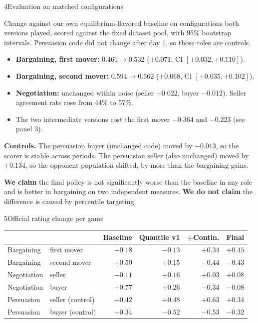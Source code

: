 \documentclass[10pt]{article}
\newcommand{\bodysize}{\fontsize{7.9}{10.3}\selectfont}
\newcommand{\smallsize}{\fontsize{6.9}{8.9}\selectfont}
\newcommand{\lead}[1]{\textbf{\color{navy}#1}}
\begin{document}
{\begin{minipage}[t][295.3mm][t]{207.8mm}
\begin{minipage}[t]{0.485\linewidth}
\begin{panel}{4\quad Evaluation on matched configurations}
\raggedright\smallsize\color{muted}
Change against our own equilibrium-flavored baseline on configurations both
versions played, scored against the fixed dataset pool, with 95\% bootstrap
intervals. Persuasion code did not change after day 1, so those roles are controls.

\vspace{1.6mm}\bodysize\color{ink}
\begin{itemize}
  \item \textbf{Bargaining, first mover:} $0.461\rightarrow0.532$
        ($+0.071$, CI $[+0.032,+0.110]$).
  \item \textbf{Bargaining, second mover:} $0.594\rightarrow0.662$
        ($+0.068$, CI $[+0.035,+0.102]$).
  \item \textbf{Negotiation:} unchanged within noise (seller $+0.022$, buyer
        $-0.012$). Seller agreement rate rose from 44\% to 57\%.
  \item The two intermediate versions cost the first mover $-0.364$ and
        $-0.223$ (see panel 3).
\end{itemize}
\vspace{1.2mm}
\lead{Controls.} The persuasion buyer (unchanged code) moved by $-0.013$, so
the scorer is stable across periods. The persuasion seller (also unchanged)
moved by $+0.134$, so the opponent population shifted, by more than the
bargaining gains.
\begin{tcolorbox}[colback=good!9, colframe=good!9, arc=1mm, boxrule=0pt,
  left=2mm, right=2mm, top=1.3mm, bottom=1.3mm, before skip=1.8mm, after skip=0mm]\bodysize
\textbf{We claim} the final policy is not significantly worse than the baseline
in any role and is better in bargaining on two independent measures.
\textbf{We do not claim} the difference is caused by percentile targeting.
\end{tcolorbox}
\end{panel}

\begin{panel}{5\quad Official rating change per game}
\centering\smallsize
\setlength{\tabcolsep}{2.6pt}
\begin{tabular}{@{}llrrrr@{}}
\toprule
 & & Baseline & Quantile v1 & +Contin. & Final\\
\midrule
Bargaining & first mover & $+0.18$ & $-0.13$ & $+0.34$ & \textbf{\color{good}$\mathbf{+0.45}$}\\
Bargaining & second mover & $+0.50$ & $+0.15$ & $-0.44$ & $-0.43$\\
Negotiation & seller & $-0.11$ & $+0.16$ & $+0.03$ & $+0.08$\\
Negotiation & buyer & $+0.77$ & $+0.26$ & $-0.34$ & $-0.08$\\
Persuasion & seller (control) & $+0.42$ & $+0.48$ & $+0.63$ & $+0.34$\\
Persuasion & buyer (control) & $+0.34$ & $-0.52$ & $-0.53$ & $-0.32$\\
\bottomrule
\end{tabular}


\end{panel}
\end{minipage}
\end{minipage}}
\end{document}
